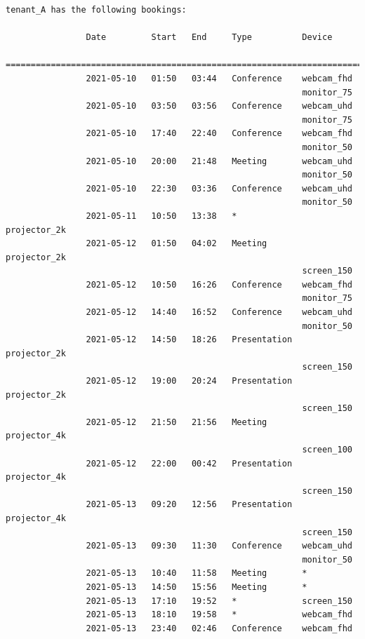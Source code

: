 \documentclass{article}
\begin{document}
\begin{Verbatim}[gobble=8]
                tenant_A has the following bookings:
                
                Date         Start   End     Type          Device
                ===========================================================================
                2021-05-10   01:50   03:44   Conference    webcam_fhd
                                                           monitor_75
                2021-05-10   03:50   03:56   Conference    webcam_uhd
                                                           monitor_75
                2021-05-10   17:40   22:40   Conference    webcam_fhd
                                                           monitor_50
                2021-05-10   20:00   21:48   Meeting       webcam_uhd
                                                           monitor_50
                2021-05-10   22:30   03:36   Conference    webcam_uhd
                                                           monitor_50
                2021-05-11   10:50   13:38   *             projector_2k
                2021-05-12   01:50   04:02   Meeting       projector_2k
                                                           screen_150
                2021-05-12   10:50   16:26   Conference    webcam_fhd
                                                           monitor_75
                2021-05-12   14:40   16:52   Conference    webcam_uhd
                                                           monitor_50
                2021-05-12   14:50   18:26   Presentation  projector_2k
                                                           screen_150
                2021-05-12   19:00   20:24   Presentation  projector_2k
                                                           screen_150
                2021-05-12   21:50   21:56   Meeting       projector_4k
                                                           screen_100
                2021-05-12   22:00   00:42   Presentation  projector_4k
                                                           screen_150
                2021-05-13   09:20   12:56   Presentation  projector_4k
                                                           screen_150
                2021-05-13   09:30   11:30   Conference    webcam_uhd
                                                           monitor_50
                2021-05-13   10:40   11:58   Meeting       *
                2021-05-13   14:50   15:56   Meeting       *
                2021-05-13   17:10   19:52   *             screen_150
                2021-05-13   18:10   19:58   *             webcam_fhd
                2021-05-13   23:40   02:46   Conference    webcam_fhd

\end{Verbatim}
\end{document}

